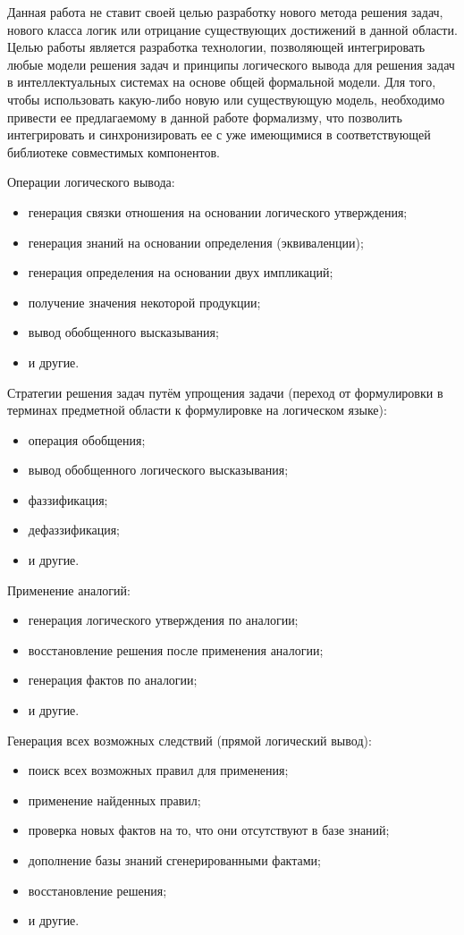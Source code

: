 Данная работа не ставит своей целью разработку нового метода решения задач, нового класса логик или отрицание существующих достижений в данной области. Целью работы является разработка технологии, позволяющей интегрировать любые модели решения задач и принципы логического вывода для решения задач в интеллектуальных системах на основе общей формальной модели. Для того, чтобы использовать какую-либо новую или существующую модель, необходимо привести ее предлагаемому в данной работе формализму, что позволить интегрировать и синхронизировать ее с уже имеющимися в соответствующей библиотеке совместимых компонентов.

Операции логического вывода:
\begin{itemize}
	\item{генерация связки отношения на основании логического утверждения;}
	\item{генерация знаний на основании определения (эквиваленции);}
	\item{генерация определения на основании двух импликаций;}
	\item{получение значения некоторой продукции;}
	\item{вывод обобщенного высказывания;}
	\item{и другие.}
\end{itemize}

Стратегии решения задач путём упрощения задачи (переход от формулировки в терминах предметной области к формулировке на логическом языке):
\begin{itemize}
	\item{операция обобщения;}
	\item{вывод обобщенного логического высказывания;}
	\item{фаззификация;}
	\item{дефаззификация;}
	\item{и другие.}
\end{itemize}

Применение аналогий:
\begin{itemize}
	\item{генерация логического утверждения по аналогии;}
	\item{восстановление решения после применения аналогии;}
	\item{генерация фактов по аналогии;}
	\item{и другие.}
\end{itemize}

Генерация всех возможных следствий (прямой логический вывод):
\begin{itemize}
	\item{поиск всех возможных правил для применения;}
	\item{применение найденных правил;}
	\item{проверка новых фактов на то, что они отсутствуют в базе знаний;}
	\item{дополнение базы знаний сгенерированными фактами;}
	\item{восстановление решения;}
	\item{и другие.}
\end{itemize}

